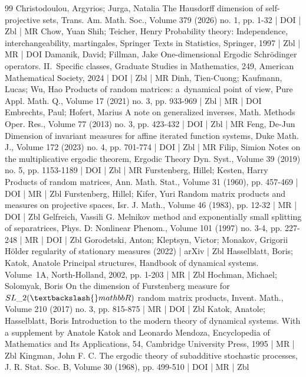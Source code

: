 \begin{thebibliography}{99}
 Christodoulou, Argyrios; Jurga, Natalia The Hausdorff dimension of self-projective sets, Trans. Am. Math. Soc., Volume 379 (2026) no. 1, pp. 1-32 | DOI | Zbl | MR
 Chow, Yuan Shih; Teicher, Henry Probability theory: Independence, interchangeability, martingales, Springer Texts in Statistics, Springer, 1997 | Zbl | MR | DOI
 Damanik, David; Fillman, Jake One-dimensional Ergodic Schrödinger operators. II. Specific classes, Graduate Studies in Mathematics, 249, American Mathematical Society, 2024 | DOI | Zbl | MR
 Dinh, Tien-Cuong; Kaufmann, Lucas; Wu, Hao Products of random matrices: a dynamical point of view, Pure Appl. Math. Q., Volume 17 (2021) no. 3, pp. 933-969 | Zbl | MR | DOI
 Embrechts, Paul; Hofert, Marius A note on generalized inverses, Math. Methods Oper. Res., Volume 77 (2013) no. 3, pp. 423-432 | DOI | Zbl | MR
 Feng, De-Jun Dimension of invariant measures for affine iterated function systems, Duke Math. J., Volume 172 (2023) no. 4, pp. 701-774 | DOI | Zbl | MR
 Filip, Simion Notes on the multiplicative ergodic theorem, Ergodic Theory Dyn. Syst., Volume 39 (2019) no. 5, pp. 1153-1189 | DOI | Zbl | MR
 Furstenberg, Hillel; Kesten, Harry Products of random matrices, Ann. Math. Stat., Volume 31 (1960), pp. 457-469 | DOI | MR | Zbl
 Furstenberg, Hillel; Kifer, Yuri Random matrix products and measures on projective spaces, Isr. J. Math., Volume 46 (1983), pp. 12-32 | MR | DOI | Zbl
 Gelfreich, Vassili G. Melnikov method and exponentially small splitting of separatrices, Phys. D: Nonlinear Phenom., Volume 101 (1997) no. 3-4, pp. 227-248 | MR | DOI | Zbl
 Gorodetski, Anton; Kleptsyn, Victor; Monakov, Grigorii Hölder regularity of stationary measures (2022) | arXiv | Zbl
 Hasselblatt, Boris; Katok, Anatole Principal structures, Handbook of dynamical systems. Volume 1A, North-Holland, 2002, pp. 1-203 | MR | Zbl
 Hochman, Michael; Solomyak, Boris On the dimension of Furstenberg measure for ${SL}\_{2}(\textbackslash{}mathbb{R})$ random matrix products, Invent. Math., Volume 210 (2017) no. 3, pp. 815-875 | MR | DOI | Zbl
 Katok, Anatole; Hasselblatt, Boris Introduction to the modern theory of dynamical systems. With a supplement by Anatole Katok and Leonardo Mendoza, Encyclopedia of Mathematics and Its Applications, 54, Cambridge University Press, 1995 | MR | Zbl
 Kingman, John F. C. The ergodic theory of subadditive stochastic processes, J. R. Stat. Soc. B, Volume 30 (1968), pp. 499-510 | DOI | MR | Zbl

\end{thebibliography}
